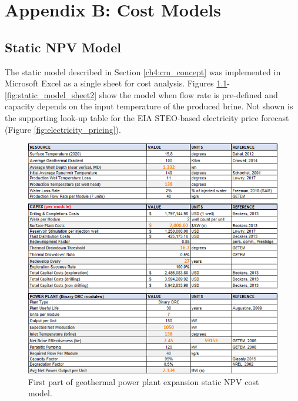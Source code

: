 \chapter{Appendix B: Cost Models}
\label{app:b}

\section{Static NPV Model}
The static model described in Section \ref{ch4:cm_concept} was implemented in Microsoft Excel as a single sheet for cost analysis. Figures \ref{fig:static_model_sheet1}-\ref{fig:static_model_sheet2} show the model when flow rate is pre-defined and capacity depends on the input temperature of the produced brine. Not shown is the supporting look-up table for the EIA STEO-based electricity price forecast (Figure \ref{fig:electricity_pricing}).

\begin{figure}[!htp]
\centering
\includegraphics[width=\textwidth]{templates/images/Figure-Static_Model_SheetA.png}
\caption[Static cost model worksheet (part 1)]{First part of geothermal power plant expansion static NPV cost model.}
\label{fig:static_model_sheet1}
\end{figure}


